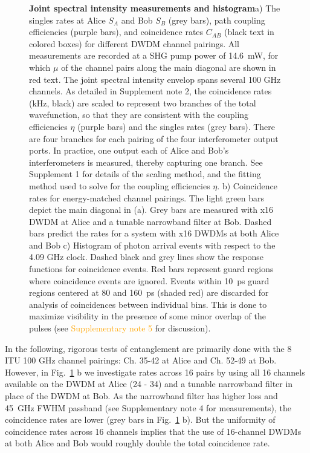 \documentclass[11pt]{caltech_thesis} %
\begin{document}
{\begin{figure}
\caption[{Joint spectral intensity measurements and histogram}]{\textbf{Joint spectral intensity measurements and histogram}a) The singles rates at Alice $S_A$ and Bob $S_B$ (grey bars), path coupling efficiencies (purple bars), and coincidence rates $C_{AB}$ (black text in colored boxes) for different DWDM channel pairings. All measurements are recorded at a SHG pump power of 14.6~mW, for which $\mu$ of the channel pairs along the main diagonal are shown in red text. The joint spectral intensity envelop spans several 100 GHz channels. As detailed in Supplement note 2, the coincidence rates (kHz, black) are scaled to represent two branches of the total wavefunction, so that they are consistent with the coupling efficiencies $\eta$ (purple bars) and the singles rates (grey bars). There are four branches for each pairing of the four interferometer output ports. In practice, one output each of Alice and Bob's interferometers is measured, thereby capturing one branch. See Supplement 1 for details of the scaling method, and the fitting method used to solve for the coupling efficiencies $\eta$. b) Coincidence rates for energy-matched channel pairings. The light green bars depict the main diagonal in (a). Grey bars are measured with x16 DWDM at Alice and a tunable narrowband filter at Bob. Dashed bars predict the rates for a system with x16 DWDMs at both Alice and Bob c) Histogram of photon arrival events with respect to the 4.09 GHz clock. Dashed black and grey lines show the response functions for coincidence events. Red bars represent guard regions where coincidence events are ignored. Events within 10~ps guard regions centered at 80 and 160~ps (shaded red) are discarded for analysis of coincidences between individual bins. This is done to maximize visibility in the presence of some minor overlap of the pulses (see \textcolor{orange}{Supplementary note 5} for discussion).}
\label{fig:figure_2nd_1}
\end{figure}
}

In the following, rigorous tests of entanglement are primarily done with the 8 ITU 100 GHz channel pairings: Ch. 35-42 at Alice and Ch. 52-49 at Bob. However, in Fig.~\ref{fig:figure_2nd_1} b we investigate rates across 16 pairs by using all 16 channels available on the DWDM at Alice (24 - 34) and a tunable narrowband filter in place of the DWDM at Bob. As the narrowband filter has higher loss and 45~GHz FWHM passband (see Supplementary note 4 for measurements), the coincidence rates are lower (grey bars in Fig.~\ref{fig:figure_2nd_1} b). But the uniformity of coincidence rates across 16 channels implies that the use of 16-channel DWDMs at both Alice and Bob would roughly double the total coincidence rate.
\end{document}
